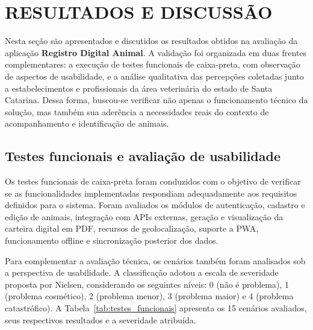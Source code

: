 \begingroup
\makeatletter
\makeatother

\section{RESULTADOS E DISCUSSÃO}

Nesta seção são apresentados e discutidos os resultados obtidos na avaliação da aplicação \textbf{Registro Digital Animal}. A validação foi organizada em duas frentes complementares: a execução de testes funcionais de caixa-preta, com observação de aspectos de usabilidade, e a análise qualitativa das percepções coletadas junto a estabelecimentos e profissionais da área veterinária do estado de Santa Catarina. Dessa forma, buscou-se verificar não apenas o funcionamento técnico da solução, mas também sua aderência a necessidades reais do contexto de acompanhamento e identificação de animais.

\subsection{Testes funcionais e avaliação de usabilidade}

Os testes funcionais de caixa-preta foram conduzidos com o objetivo de verificar se as funcionalidades implementadas respondiam adequadamente aos requisitos definidos para o sistema. Foram avaliados os módulos de autenticação, cadastro e edição de animais, integração com APIs externas, geração e visualização da carteira digital em PDF, recursos de geolocalização, suporte a PWA, funcionamento offline e sincronização posterior dos dados.

Para complementar a avaliação técnica, os cenários também foram analisados sob a perspectiva de usabilidade. A classificação adotou a escala de severidade proposta por Nielsen, considerando os seguintes níveis: 0 (não é problema), 1 (problema cosmético), 2 (problema menor), 3 (problema maior) e 4 (problema catastrófico). A Tabela~\ref{tab:testes_funcionais} apresenta os 15 cenários avaliados, seus respectivos resultados e a severidade atribuída.

